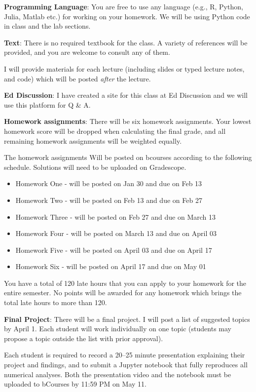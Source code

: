 \documentclass[12pt,oneside]{amsart}
\begin{document}
\noindent \textbf{Programming Language}: You are free to use any
language (e.g., R, Python, Julia, Matlab etc.) for working on your
homework. We will be using Python code in class and the lab sections. 

\noindent \textbf{Text}: There is no required textbook for the
class. A variety of references will be provided, and you are welcome
to consult any of them. 

I will provide materials for each lecture (including slides or typed
lecture notes, and code) which will be posted \textit{after} the
lecture. 

\noindent \textbf{Ed Discussion}: I have created a site
for this class at Ed Discussion and we will use this platform for Q \&
A.

\noindent \textbf{Homework assignments}: There will be six homework
assignments. Your lowest homework score will be dropped when
calculating the final grade, and all remaining homework assignments
will be weighted equally. 

The homework assignments Will be posted on bcourses
according to the following schedule. Solutions will need to be
uploaded on Gradescope. 
\begin{itemize}
\item Homework One - will be posted on Jan 30 and due on Feb 13
\item Homework Two - will be posted on Feb 13 and due on Feb 27
\item Homework Three - will be posted on Feb 27 and due on March 13
\item Homework Four - will be posted on March 13 and due on April 03
\item Homework Five - will be posted on April 03 and due on April 17
\item Homework Six - will be posted on April 17 and due on May 01  
\end{itemize}
You have a total of 120 late hours that you can apply to your homework
for the entire semester. No points will be awarded for any homework
which brings the total late hours to more than 120.   

\noindent \textbf{Final Project}: There will be a final project. I
will post a list of suggested topics by April 1. Each student will
work individually on one topic (students may propose a topic outside
the list with prior approval). 

Each student is required to record a 20–25 minute presentation
explaining their project and findings, and to submit a Jupyter
notebook that fully reproduces all numerical analyses. Both the
presentation video and the notebook must be uploaded to bCourses by
11:59 PM on May 11. 
\end{document}
